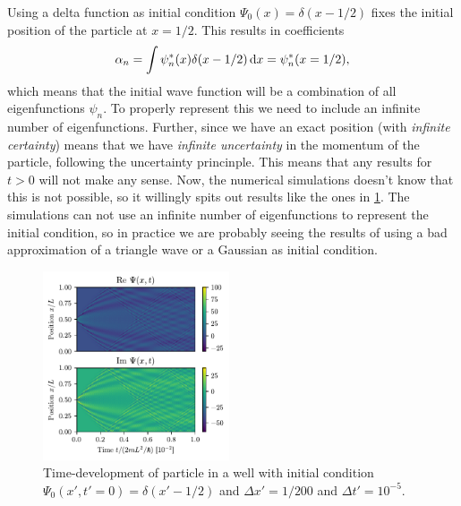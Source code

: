Using a delta function as initial condition $\Psi_0(x) = \delta(x - 1/2)$ fixes the initial position of the particle at $x=1/2$. This results in coefficients
\begin{equation}
    \alpha_n = \int \psi_n^{*}(x)\delta(x - 1/2) \mathop{}\!\mathrm{d} x = \psi_n^{*}(x=1/2),
\end{equation}
which means that the initial wave function will be a combination of all eigenfunctions $\psi_n$. To properly represent this we need to include an infinite number of eigenfunctions. Further, since we have an exact position (with \emph{infinite certainty}) means that we have \emph{infinite uncertainty} in the momentum of the particle, following the uncertainty princinple. This means that any results for $t>0$ will not make any sense. Now, the numerical simulations doesn't know that this is not possible, so it willingly spits out results like the ones in \cref{fig:box_time_deltaf}. The simulations can not use an infinite number of eigenfunctions to represent the initial condition, so in practice we are probably seeing the results of using a bad approximation of a triangle wave or a Gaussian as initial condition.

\begin{figure}[ht!]%
\centering%
\includegraphics[width=0.49\textwidth]{figs/box_deltaf.pdf}%
\caption{Time-development of particle in a well with initial condition $\Psi_0(x',t'=0) = \delta(x' - 1/2)$ and $\Delta x' = 1/200$ and $\Delta t' = 10^{-5}$. \label{fig:box_time_deltaf}}%
\end{figure}

